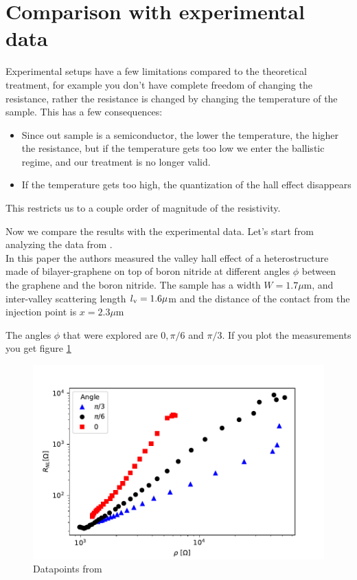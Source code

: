 \section{Comparison with experimental data}
Experimental setups have a few limitations compared to the theoretical treatment, for example you don't have complete freedom of changing the resistance, rather the resistance is changed by changing the temperature of the sample.
This has a few consequences: 
\begin{itemize}
    \item Since out sample is a semiconductor, the lower the temperature, the higher the resistance, but if the temperature gets too low we enter the ballistic regime, and our treatment is no longer valid.
    \item If the temperature gets too high, the quantization of the hall effect disappears
\end{itemize}
This restricts us to a couple order of magnitude of the resistivity.

Now we compare the results with the experimental data. Let's start from analyzing the data from  \cite{rebecca2022moirè}.\\
In this paper the authors measured the valley hall effect of a heterostructure made of bilayer-graphene on top of boron nitride at different angles $\phi$ between the graphene and the boron nitride. The sample has a width $W=1.7\mu$m, and inter-valley scattering length $l_{\textrm v}=1.6\mu$m and the distance of the contact from the injection point is $x=2.3\mu$m

The angles $\phi$ that were explored are $0,\pi/6$ and $\pi/3$. If you plot the measurements you get figure \ref{fig:rebeccadatapoints}

\begin{figure}[h!]
    \centering
    \includegraphics[width=\linewidth]{Immagini/rnl/rebecca_data.pdf}
    \caption{Datapoints from \cite{rebecca2022moirè}}
    \label{fig:rebeccadatapoints}
\end{figure}

